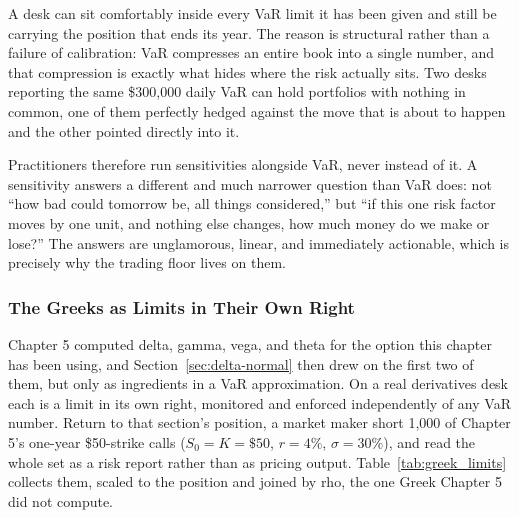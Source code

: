 \documentclass[../ai_in_finance]{subfiles}
\begin{document}
A desk can sit comfortably inside every VaR limit it has been given and still be carrying the position that ends its year. The reason is structural rather than a failure of calibration: VaR compresses an entire book into a single number, and that compression is exactly what hides where the risk actually sits. Two desks reporting the same \$300,000 daily VaR can hold portfolios with nothing in common, one of them perfectly hedged against the move that is about to happen and the other pointed directly into it.

Practitioners therefore run sensitivities alongside VaR, never instead of it. A sensitivity answers a different and much narrower question than VaR does: not ``how bad could tomorrow be, all things considered,'' but ``if this one risk factor moves by one unit, and nothing else changes, how much money do we make or lose?'' The answers are unglamorous, linear, and immediately actionable, which is precisely why the trading floor lives on them.

\subsubsection*{The Greeks as Limits in Their Own Right}

Chapter 5 computed delta, gamma, vega, and theta for the option this chapter has been using, and Section~\ref{sec:delta-normal} then drew on the first two of them, but only as ingredients in a VaR approximation. On a real derivatives desk each is a limit in its own right, monitored and enforced independently of any VaR number. Return to that section's position, a market maker short 1,000 of Chapter 5's one-year \$50-strike calls ($S_0=K=\$50$, $r=4\%$, $\sigma=30\%$), and read the whole set as a risk report rather than as pricing output. Table~\ref{tab:greek_limits} collects them, scaled to the position and joined by rho, the one Greek Chapter 5 did not compute.
\end{document}
